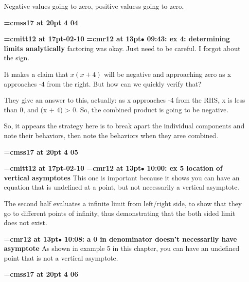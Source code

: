 Negative values going to zero, positive valuess going to zero.
\par

{\medskip\noindent\bf\font\titlefont=cmss17 at 20pt 4 04}\medskip

{\medskip\noindent\bf\font\titlefont=cmitt12 at 17pt-02-10}\medskip
{\smallskip\noindent\bf\font\titlefont=cmr12 at 13pt\titlefont $\bullet$ 09:43: ex 4: determining limits analytically}\smallskip
factoring was okay. Just need to be careful. I forgot about the sign.
\par

It makes a claim that $x(x + 4)$ will be negative and approaching zero as x approaches -4 from the right. But how can we quickly verify that?
\par

They give an answer to this, actually: as x approaches -4 from the RHS, x is less than 0, and (x + 4) > 0. So, the combined product is going to be negative.
\par

So, it appears the strategy here is to break apart the individual components and note their behaviors, then note the behaviors when they aree combined.
\par

{\medskip\noindent\bf\font\titlefont=cmss17 at 20pt 4 05}\medskip

{\medskip\noindent\bf\font\titlefont=cmitt12 at 17pt-02-10}\medskip
{\smallskip\noindent\bf\font\titlefont=cmr12 at 13pt\titlefont $\bullet$ 10:00: ex 5 location of vertical asymptotes}\smallskip
This one is important because it shows you can have an equation that is undefined at a point, but not necessarily a vertical asymptote.
\par

The second half evaluates a infinite limit from left/right side, to show that they go to different points of infinity, thus demonstrating that the both sided limit does not exist.
\par

{\smallskip\noindent\bf\font\titlefont=cmr12 at 13pt\titlefont $\bullet$ 10:08: a 0 in denominator doesn't necessarily have asymptote}\smallskip
As shown in example 5 in this chapter, you can have an undefined point that is not a vertical asymptote.
\par

{\medskip\noindent\bf\font\titlefont=cmss17 at 20pt 4 06}\medskip

